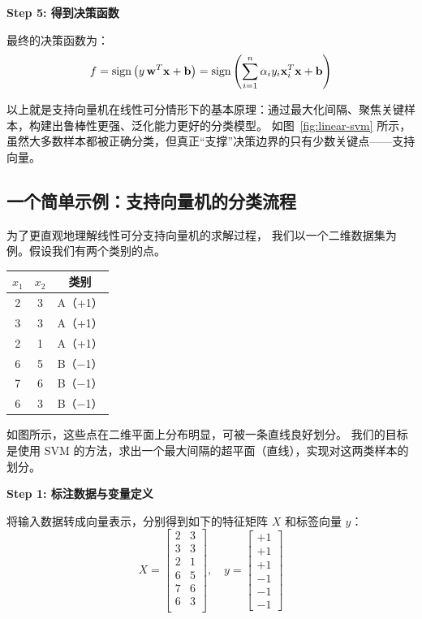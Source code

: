 \textbf{Step 5: 得到决策函数}

最终的决策函数为：
$$
f= {\rm sign}\left( y\, {\bf w}^T {\bf x} +{\bf b}\right)= {\rm sign}\left(\sum_{i=1}^n \alpha_i y_i {\bf x}_i^T {\bf x} +{\bf b}\right)
$$

以上就是支持向量机在线性可分情形下的基本原理：通过最大化间隔、聚焦关键样本，构建出鲁棒性更强、泛化能力更好的分类模型。
如图~\ref{fig:linear-svm} 所示，虽然大多数样本都被正确分类，但真正“支撑”决策边界的只有少数关键点——支持向量。


\subsection{一个简单示例：支持向量机的分类流程}

为了更直观地理解线性可分支持向量机的求解过程，
我们以一个二维数据集为例。假设我们有两个类别的点。

\begin{center}
\begin{tabular}{ccc}
\toprule
$x_1$ & $x_2$ & 类别 \\
\midrule
2 & 3 & A（+1） \\
3 & 3 & A（+1） \\
2 & 1 & A（+1） \\
6 & 5 & B（−1） \\
7 & 6 & B（−1） \\
6 & 3 & B（−1） \\
\bottomrule
\end{tabular}
\end{center}

如图所示，这些点在二维平面上分布明显，可被一条直线良好划分。
我们的目标是使用 SVM 的方法，求出一个最大间隔的超平面（直线），实现对这两类样本的划分。

\vspace{0.5em}
\textbf{Step 1: 标注数据与变量定义}


将输入数据转成向量表示，分别得到如下的特征矩阵 $X$ 和标签向量 $y$：
\[
X = \begin{bmatrix}
2 & 3 \\
3 & 3 \\
2 & 1 \\
6 & 5 \\
7 & 6 \\
6 & 3 \\
\end{bmatrix}, \quad
y = \begin{bmatrix}
+1 \\ +1 \\ +1 \\ -1 \\ -1 \\ -1
\end{bmatrix}
\]


